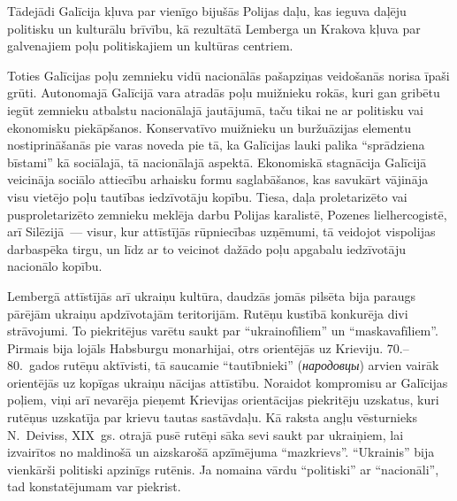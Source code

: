 \documentclass[twoside,a5paper,12pt,fleqn,openany]{extbook}
\newcommand{\rutxti}[1]{\textit{\textrussian{#1}}}
\begin{document}
Tādejādi Galīcija kļuva par vienīgo bijušās Polijas daļu, kas ieguva daļēju politisku un kulturālu brīvību, kā rezultātā Lemberga un Krakova kļuva par galvenajiem poļu politiskajiem un kultūras centriem.

Toties Galīcijas poļu zemnieku vidū nacionālās pašapziņas veidošanās norisa īpaši grūti. Autonomajā Galīcijā vara atradās poļu muižnieku rokās, kuri gan gribētu iegūt zemnieku atbalstu nacionālajā jautājumā, taču tikai ne ar politisku vai ekonomisku piekāpšanos. Konservatīvo muižnieku un buržuāzijas elementu nostiprināšanās pie varas noveda pie tā, ka Galīcijas lauki palika ``sprādziena bīstami'' kā sociālajā, tā nacionālajā aspektā. Ekonomiskā stagnācija Galīcijā veicināja sociālo attiecību arhaisku formu saglabāšanos, kas savukārt vājināja visu vietējo poļu tautības iedzīvotāju kopību. Tiesa, daļa proletarizēto vai pusproletarizēto zemnieku meklēja darbu Polijas karalistē, Pozenes lielhercogistē, arī Silēzijā~--- visur, kur attīstījās rūpniecības uzņēmumi, tā veidojot vispolijas darbaspēka tirgu, un līdz ar to veicinot dažādo poļu apgabalu iedzīvotāju nacionālo kopību.

Lembergā attīstījās arī ukraiņu kultūra, daudzās jomās pilsēta bija paraugs pārējām ukraiņu apdzīvotajām teritorijām. Rutēņu kustībā konkurēja divi strāvojumi. To piekritējus varētu saukt par ``ukrainofīliem'' un ``maskavafīliem''. Pirmais bija lojāls Habsburgu monarhijai, otrs orientējās uz Krieviju. 70.--80.~gados rutēņu aktīvisti, tā saucamie ``tautībnieki'' (\rutxti{народовцы}) arvien vairāk orientējās uz kopīgas ukraiņu nācijas attīstību. Noraidot kompromisu ar Galīcijas poļiem, viņi arī nevarēja pieņemt Krievijas orientācijas piekritēju uzskatus, kuri rutēņus uzskatīja par krievu tautas sastāvdaļu. Kā raksta angļu vēsturnieks N.~Deiviss, XIX~gs. otrajā pusē rutēņi sāka sevi saukt par ukraiņiem, lai izvairītos no maldinošā un aizskarošā apzīmējuma ``mazkrievs''. ``Ukrainis'' bija vienkārši politiski apzinīgs rutēnis. Ja nomaina vārdu ``politiski'' ar ``nacionāli'', tad konstatējumam var piekrist.
\end{document}
